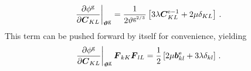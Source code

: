\documentclass[10pt,letterpaper,oneside]{report}
\newcommand{\ten}[1]{\mbox{\boldmath $#1$}{}}
\newcommand{\tenf}[1]{\mbox{{\sffamily{\bfseries {#1}}}}}
\newcommand{\scas}[1]{\mbox{{\scriptsize{${\rm{#1}}$}}}{}}
\newcommand{\tens}[1]{\mbox{\boldmath{\scriptsize{$#1$}}}{}}
\begin{document}
\begin{align}
\left. \frac{ \partial \phi^{\scas{g}} }{ \partial \ten{C}_{KL} } \right|_{\tens{\vartheta}^{\scas{g}}}  ={}& \frac{1}{2 \vartheta^{\scas{g}^{2/3}}} \left[ 3 \lambda \ten{C}^{\scas{e}-1}_{KL} + 2 \mu \delta_{KL} \right] \, . 
\end{align}
This term can be pushed forward by itself for convenience, yielding 
\begin{align}
\left. \frac{\partial \phi^{\scas{g}} }{\partial \ten{C}_{KL}} \right|_{\tens{\vartheta}^{\scas{g}}} \ten{F}_{kK} \ten{F}_{lL} 
={}& \frac{1}{2} \left[ 2 \mu \ten{b}^{\scas{e}}_{kl} + 3 \lambda \delta_{kl} \right] \, . 
\label{growth_criterion_deriv_Mandel}
\end{align}
\end{document}
